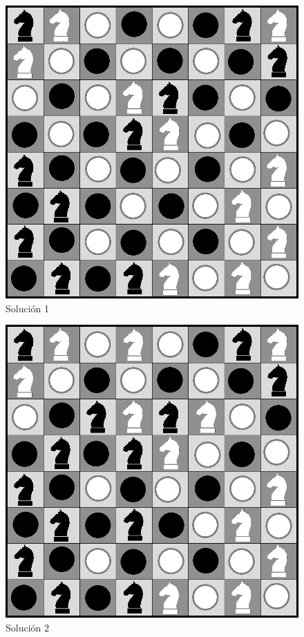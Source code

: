 \documentclass[a4paper]{article}
\begin{document}
 \begin{figure}[h!]
   \begin{center}
 	\includegraphics[scale=0.3]{imagenes/ej3/optimaCreo.png}
 	\caption{Soluci\'on 1}
   \end{center}
 \end{figure}
 
\newpage 
 
 
 \begin{figure}[h!]
   \begin{center}
 	\includegraphics[scale=0.3]{imagenes/ej3/con5mas.png}
 	\caption{Soluci\'on 2}
   \end{center}
 \end{figure}
\end{document}
